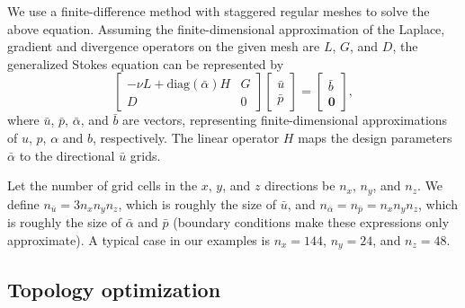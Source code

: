 \documentclass[times]{fldauth}
\begin{document}
We use a finite-difference method with staggered regular meshes to
solve the above equation. Assuming the finite-dimensional
approximation of the Laplace, gradient and divergence operators on the
given mesh are $L$, $G$, and $D$, the generalized Stokes equation can
be represented by
\begin{equation}
  \label{discretestokes}
  \begin{bmatrix}
      -\nu L + \text{diag}(\bar{\alpha})H & G \\
             D                            &  0
    \end{bmatrix}
  \begin{bmatrix}
      \bar{u} \\ \bar{p}
    \end{bmatrix} =
  \begin{bmatrix}
      \bar{b} \\ \mathbf{0}
    \end{bmatrix},
\end{equation}
where $\bar{u}$, $\bar{p}$, $\bar{\alpha}$, and $\bar{b}$ are vectors,
representing finite-dimensional approximations of $u$, $p$, $\alpha$
and $b$, respectively. The linear operator $H$ maps the design
parameters $\bar{\alpha}$ to the directional $\bar{u}$ grids.

Let the number of grid cells in the $x$, $y$, and $z$ directions be
$n_x$, $n_y$, and $n_z$. We define $n_{\bar{u}} = 3n_x n_y n_z$, which
is roughly the size of $\bar{u}$, and $n_{\bar{\alpha}}=n_{\bar{p}} =
n_x n_y n_z$, which is roughly the size of $\bar{\alpha}$ and
$\bar{p}$ (boundary conditions make these expressions only
approximate). A typical case in our examples is $n_x = 144$, $n_y=24$,
and $n_z=48$.

\subsection{Topology optimization}
\end{document}
